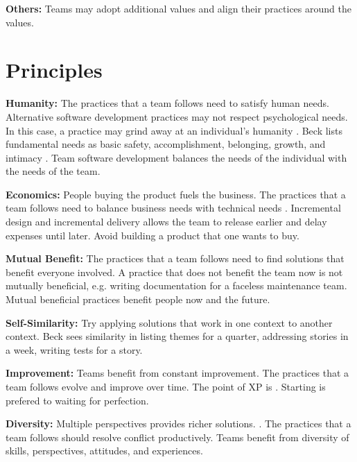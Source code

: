 \textbf{Others:} Teams may adopt additional values and align their practices around the values. 


\section{Principles}
\textbf{Humanity:} The practices that a team follows need to satisfy human needs. Alternative software development practices may not respect psychological needs. In this case, a practice may grind away at an individual's humanity \cite{BeckExtremeProgramming2004}. Beck lists fundamental needs as basic safety, accomplishment, belonging, growth, and intimacy \cite{BeckExtremeProgramming2004}. Team software development balances the needs of the individual with the needs of the team. 


\textbf{Economics:} People buying the product fuels the business. The practices that a team follows need to balance business needs with technical needs \cite{BeckExtremeProgramming2004}. Incremental design and incremental delivery allows the team to release earlier and delay expenses until later. Avoid building a  product that one wants to buy.


\textbf{Mutual Benefit:} The practices that a team follows need to find solutions that benefit everyone involved. A practice that does not benefit the team now is not mutually beneficial, e.g. writing documentation for a faceless maintenance team. Mutual beneficial practices benefit people now and the future. 


\textbf{Self-Similarity:} Try applying solutions that work in one context to another context. Beck sees similarity in listing themes for a quarter, addressing stories in a week, writing tests for a story.


\textbf{Improvement:} Teams benefit from constant improvement. The practices that a team follows evolve and improve over time. The point of XP is  \cite{BeckExtremeProgramming2004}. Starting is prefered to waiting for perfection. 


\textbf{Diversity:} Multiple perspectives provides richer solutions.   \cite{BeckExtremeProgramming2004}. The practices that a team follows should resolve conflict productively. Teams benefit from diversity of skills, perspectives, attitudes, and experiences.


